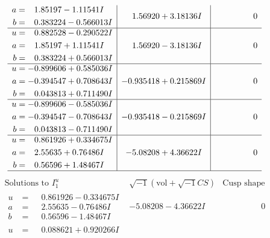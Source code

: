 \documentclass[1p]{elsarticle_modified}
\theoremstyle{definition}
\newcommand{\I}{\sqrt{-1}}
\begin{document}
$$\begin{array}{c|c|c}
\begin{aligned}
a &= \phantom{-}1.85197 - 1.11541 I \\
b &= \phantom{-}0.383224 - 0.566013 I\end{aligned}
 & \phantom{-}1.56920 + 3.18136 I & \phantom{-0.000000 } 0 \\ \hline\begin{aligned}
u &= \phantom{-}0.882528 - 0.290522 I \\
a &= \phantom{-}1.85197 + 1.11541 I \\
b &= \phantom{-}0.383224 + 0.566013 I\end{aligned}
 & \phantom{-}1.56920 - 3.18136 I & \phantom{-0.000000 } 0 \\ \hline\begin{aligned}
u &= -0.899606 + 0.585036 I \\
a &= -0.394547 + 0.708643 I \\
b &= \phantom{-}0.043813 + 0.711490 I\end{aligned}
 & -0.935418 + 0.215869 I & \phantom{-0.000000 } 0 \\ \hline\begin{aligned}
u &= -0.899606 - 0.585036 I \\
a &= -0.394547 - 0.708643 I \\
b &= \phantom{-}0.043813 - 0.711490 I\end{aligned}
 & -0.935418 - 0.215869 I & \phantom{-0.000000 } 0 \\ \hline\begin{aligned}
u &= \phantom{-}0.861926 + 0.334675 I \\
a &= \phantom{-}2.55635 + 0.76486 I \\
b &= \phantom{-}0.56596 + 1.48467 I\end{aligned}
 & -5.08208 + 4.36622 I & \phantom{-0.000000 } 0\\
 \hline 
 \end{array}$$\newpage$$\begin{array}{c|c|c}  
\text{Solutions to }I^u_{1}& \I (\text{vol} + \sqrt{-1}CS) & \text{Cusp shape}\\
 \hline 
\begin{aligned}
u &= \phantom{-}0.861926 - 0.334675 I \\
a &= \phantom{-}2.55635 - 0.76486 I \\
b &= \phantom{-}0.56596 - 1.48467 I\end{aligned}
 & -5.08208 - 4.36622 I & \phantom{-0.000000 } 0 \\ \hline\begin{aligned}
u &= \phantom{-}0.088621 + 0.920266 I \\

\end{aligned}
\end{array}$$
\end{document}

